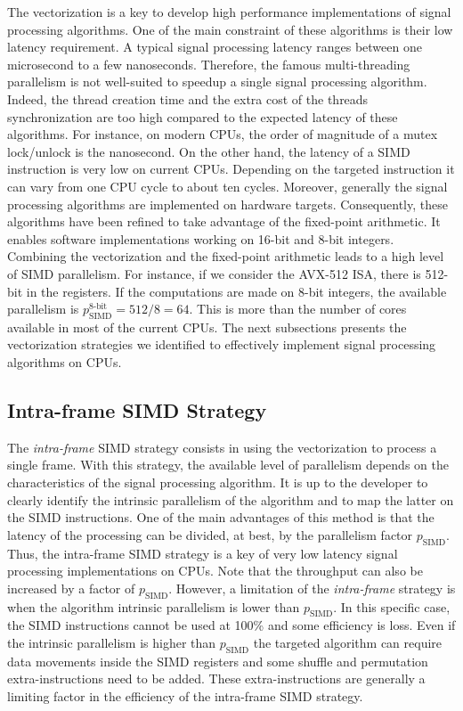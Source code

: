 The vectorization is a key to develop high performance implementations of signal
processing algorithms. One of the main constraint of these algorithms is their
low latency requirement. A typical signal processing latency ranges between
one microsecond to a few nanoseconds. Therefore, the famous multi-threading
parallelism is not well-suited to speedup a single signal processing algorithm.
Indeed, the thread creation time and the extra cost of the threads
synchronization are too high compared to the expected latency of these
algorithms. For instance, on modern CPUs, the order of magnitude of a mutex
lock/unlock is the nanosecond. On the other hand, the latency of a SIMD
instruction is very low on current CPUs. Depending on the targeted instruction
it can vary from one CPU cycle to about ten cycles. Moreover, generally the
signal processing algorithms are implemented on hardware targets. Consequently,
these algorithms have been refined to take advantage of the fixed-point
arithmetic. It enables software implementations working on 16-bit and 8-bit
integers. Combining the vectorization and the fixed-point arithmetic leads to a
high level of SIMD parallelism. For instance, if we consider the AVX-512 ISA,
there is 512-bit in the registers. If the computations are made on 8-bit
integers, the available parallelism is $p^\text{8-bit}_\text{SIMD} = 512 / 8 =
64$. This is more than the number of cores available in most of the current
CPUs. The next subsections presents the vectorization strategies we identified
to effectively implement signal processing algorithms on CPUs.

\subsection{Intra-frame SIMD Strategy}
\label{sec:opt_vec_strat_intra}

The \emph{intra-frame} SIMD strategy consists in using the vectorization to
process a single frame. With this strategy, the available level of parallelism
depends on the characteristics of the signal processing algorithm. It is up to
the developer to clearly identify the intrinsic parallelism of the algorithm and
to map the latter on the SIMD instructions. One of the main advantages of this
method is that the latency of the processing can be divided, at best, by the
parallelism factor $p_\text{SIMD}$. Thus, the intra-frame SIMD strategy is a key
of very low latency signal processing implementations on CPUs. Note that the
throughput can also be increased by a factor of $p_\text{SIMD}$. However, a
limitation of the \emph{intra-frame} strategy is when the algorithm intrinsic
parallelism is lower than $p_\text{SIMD}$. In this specific case, the SIMD
instructions cannot be used at 100\% and some efficiency is loss. Even if the
intrinsic parallelism is higher than $p_\text{SIMD}$ the targeted algorithm can
require data movements inside the SIMD registers and some shuffle and
permutation extra-instructions need to be added. These extra-instructions are
generally a limiting factor in the efficiency of the intra-frame SIMD strategy.


